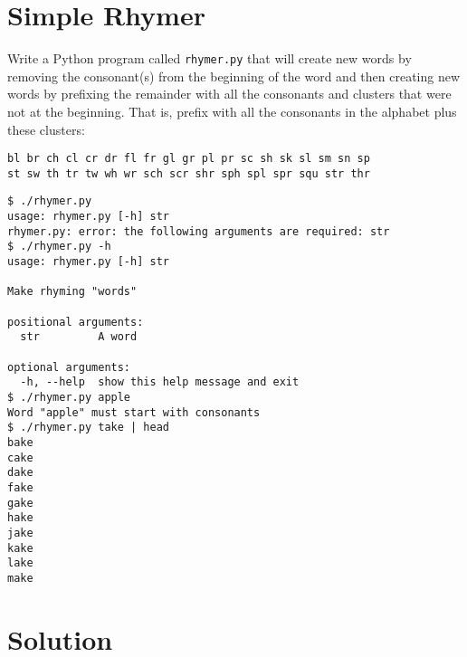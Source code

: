 \documentclass[]{article}
\begin{document}
\hypertarget{simple-rhymer}{%
\section{Simple Rhymer}\label{simple-rhymer}}

Write a Python program called \texttt{rhymer.py} that will create new
words by removing the consonant(s) from the beginning of the word and
then creating new words by prefixing the remainder with all the
consonants and clusters that were not at the beginning. That is, prefix
with all the consonants in the alphabet plus these clusters:

\begin{verbatim}
bl br ch cl cr dr fl fr gl gr pl pr sc sh sk sl sm sn sp 
st sw th tr tw wh wr sch scr shr sph spl spr squ str thr
\end{verbatim}

\begin{verbatim}
$ ./rhymer.py
usage: rhymer.py [-h] str
rhymer.py: error: the following arguments are required: str
$ ./rhymer.py -h
usage: rhymer.py [-h] str

Make rhyming "words"

positional arguments:
  str         A word

optional arguments:
  -h, --help  show this help message and exit
$ ./rhymer.py apple
Word "apple" must start with consonants  
$ ./rhymer.py take | head
bake
cake
dake
fake
gake
hake
jake
kake
lake
make
\end{verbatim}

\pagebreak

\hypertarget{solution-9}{%
\section{Solution}\label{solution-9}}
\end{document}
